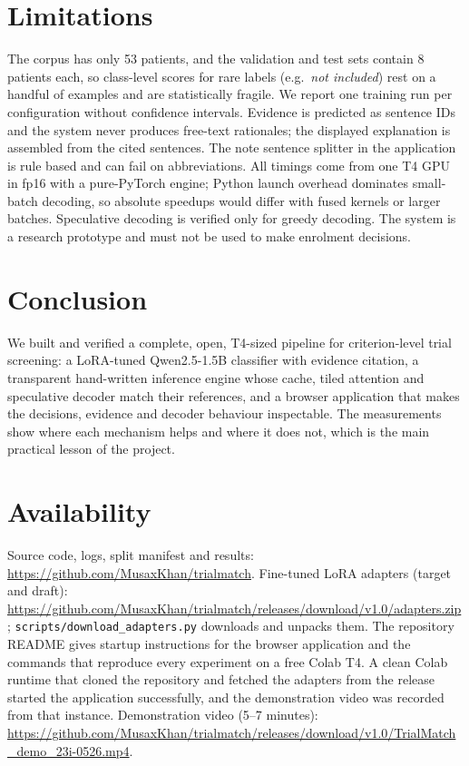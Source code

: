 \documentclass[conference]{IEEEtran}
\begin{document}
\section{Limitations}
The corpus has only 53 patients, and the validation and test sets contain 8 patients each, so class-level scores for rare labels (e.g.\ \emph{not included}) rest on a handful of examples and are statistically fragile. We report one training run per configuration without confidence intervals. Evidence is predicted as sentence IDs and the system never produces free-text rationales; the displayed explanation is assembled from the cited sentences. The note sentence splitter in the application is rule based and can fail on abbreviations. All timings come from one T4 GPU in fp16 with a pure-PyTorch engine; Python launch overhead dominates small-batch decoding, so absolute speedups would differ with fused kernels or larger batches. Speculative decoding is verified only for greedy decoding. The system is a research prototype and must not be used to make enrolment decisions.

\section{Conclusion}
We built and verified a complete, open, T4-sized pipeline for criterion-level trial screening: a LoRA-tuned Qwen2.5-1.5B classifier with evidence citation, a transparent hand-written inference engine whose cache, tiled attention and speculative decoder match their references, and a browser application that makes the decisions, evidence and decoder behaviour inspectable. The measurements show where each mechanism helps and where it does not, which is the main practical lesson of the project.

\section*{Availability}
Source code, logs, split manifest and results: \url{https://github.com/MusaxKhan/trialmatch}. Fine-tuned LoRA adapters (target and draft): \url{https://github.com/MusaxKhan/trialmatch/releases/download/v1.0/adapters.zip}; \texttt{scripts/download\_adapters.py} downloads and unpacks them. The repository README gives startup instructions for the browser application and the commands that reproduce every experiment on a free Colab T4. A clean Colab runtime that cloned the repository and fetched the adapters from the release started the application successfully, and the demonstration video was recorded from that instance. Demonstration video (5--7 minutes): \url{https://github.com/MusaxKhan/trialmatch/releases/download/v1.0/TrialMatch_demo_23i-0526.mp4}.
\end{document}

